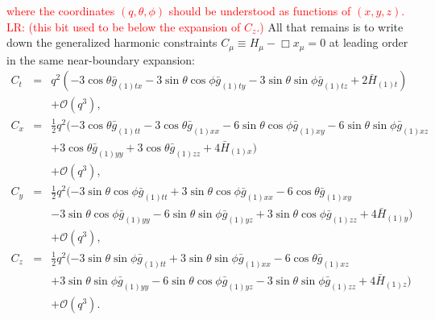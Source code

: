 \documentclass[a4paper,11pt]{article}
\numberwithin{equation}{section}
\begin{document}
\textcolor{red}{where the coordinates $(q,\theta,\phi)$ should be understood as functions of $(x,y,z)$. LR: (this bit used to be below the expansion of $C_z$.)}
All that remains is to write down the generalized harmonic constraints $C_\mu \equiv H_\mu-\Box x_\mu = 0$ at leading order in the same near-boundary expansion:
\begin{eqnarray}
\label{eqn:ct}
C_t&=&q^2 (-3 \cos \theta  \bar{g}_{(1)tx}-3 \sin \theta  \cos \phi  \bar{g}_{(1)ty}-3 \sin \theta  \sin \phi \bar{g}_{(1)tz}+2
   \bar{H}_{(1) t}) \nonumber \\
   &&+\mathcal{O}(q^3),\\
%
\label{eqn:cx}
C_x&=&\frac{1}{2} q^2 (-3 \cos \theta  \bar{g}_{(1)tt}-3 \cos \theta  \bar{g}_{(1)xx}-6 \sin \theta  \cos \phi  \bar{g}_{(1)xy}-6 \sin
   \theta  \sin \phi  \bar{g}_{(1)xz} \nonumber \\
  &&+3 \cos \theta  \bar{g}_{(1)yy}+3
   \cos \theta  \bar{g}_{(1)zz}+4 \bar{H}_{(1) x}) \nonumber \\
   &&+\mathcal{O}(q^3),\\
%
\label{eqn:cy}
C_y&=&\frac{1}{2} q^2 (-3 \sin \theta  \cos \phi  \bar{g}_{(1)tt}+3 \sin
   \theta  \cos \phi  \bar{g}_{(1)xx}-6 \cos \theta  \bar{g}_{(1)xy} \nonumber \\
   &&-3
   \sin \theta  \cos \phi  \bar{g}_{(1) yy}-6 \sin \theta  \sin \phi
   \bar{g}_{(1)yz}+3 \sin \theta  \cos \phi  \bar{g}_{(1)zz}+4
   \bar{H}_{(1) y}) \nonumber \\
   &&+\mathcal{O}(q^3),\\
%
\label{eqn:cz}
C_z&=&\frac{1}{2} q^2 (-3 \sin \theta \sin \phi  \bar{g}_{(1)tt}+3 \sin
   \theta \sin \phi \bar{g}_{(1)xx}-6 \cos \theta  \bar{g}_{(1)xz} \nonumber \\
   &&+3
   \sin \theta \sin \phi  \bar{g}_{(1)yy}-6 \sin \theta  \cos \phi    \bar{g}_{(1)yz}-3 \sin \theta  \sin \phi  \bar{g}_{(1)zz}+4
   \bar{H}_{(1)z}) \nonumber \\
   &&+\mathcal{O}(q^3).
\end{eqnarray}
\end{document}
